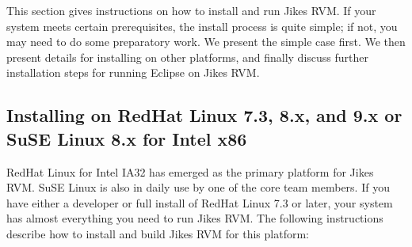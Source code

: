 This section gives instructions on how to install and run Jikes RVM.
If your system meets certain prerequisites, the install process is
quite simple; if not, you may need to do some preparatory work.  We
present the simple case first.  We then present details for installing
on other platforms, and finally discuss further installation steps for
running Eclipse on Jikes RVM.

\subsection{Installing on RedHat Linux 7.3, 8.x, and 9.x or SuSE Linux 8.x for Intel x86}

RedHat Linux for Intel IA32 has emerged as the 
primary platform for Jikes RVM.  SuSE Linux is also in daily use by one of the
core team members.
If you have either a developer or full install of RedHat
Linux 7.3 or later, your system has almost everything you need
to run Jikes RVM.  The following instructions describe how to install
and build Jikes RVM for this platform:
